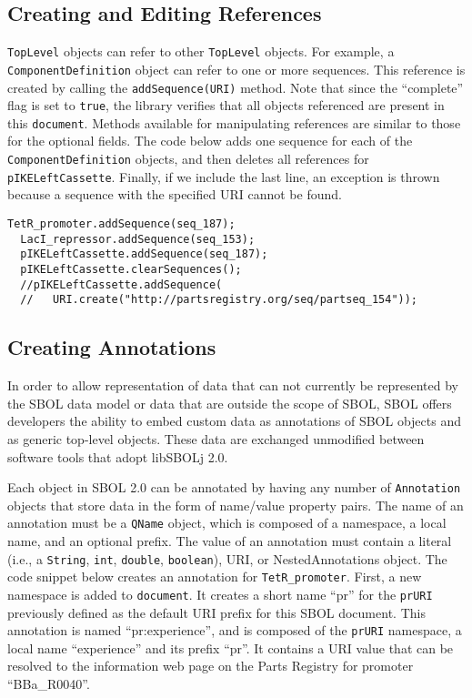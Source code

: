 \subsection*{Creating and Editing References}
\lstinline+TopLevel+ objects can refer to other \lstinline+TopLevel+ objects.  For example, 
a \lstinline+ComponentDefinition+ object can refer to one or more sequences.  This reference is created by calling the \lstinline+addSequence(URI)+ method. Note that since the ``complete'' flag is set to \lstinline+true+, the library verifies that all objects referenced are present in this \lstinline+document+. Methods available for manipulating references are similar
to those for the optional fields. The code below adds one sequence for
each of the \lstinline+ComponentDefinition+ objects, and then deletes all references for \lstinline+pIKELeftCassette+.  Finally, if we include the last line, an exception is thrown because a sequence with the specified URI cannot be found.

\begin{minipage}{0.95\textwidth} 
\begin{lstlisting}[basicstyle=\footnotesize\ttfamily]
  TetR_promoter.addSequence(seq_187);		
  LacI_repressor.addSequence(seq_153);		
  pIKELeftCassette.addSequence(seq_187);
  pIKELeftCassette.clearSequences();
  //pIKELeftCassette.addSequence(
  //   URI.create("http://partsregistry.org/seq/partseq_154"));
\end{lstlisting}
\end{minipage}

\subsection*{Creating Annotations}
In order to allow representation of data that can not currently be represented
by the SBOL data model or data that are outside the scope of SBOL,
SBOL offers developers the ability to embed custom data as annotations
of SBOL objects and as generic top-level objects. These data are exchanged unmodified between
software tools that adopt libSBOLj 2.0. 

Each object in SBOL 2.0 can be annotated by having any number of
\lstinline+Annotation+ objects that store data in the form of name/value 
property pairs. The name of an annotation must be a \lstinline+QName+
object, which is composed of a namespace, a
local name, and an optional prefix. The value of an annotation must contain a literal (i.e., a
\lstinline+String+, \lstinline+int+, \lstinline+double+,
\lstinline+boolean+), URI, or NestedAnnotations object. The code
snippet below creates an annotation for \lstinline+TetR_promoter+. First, a new namespace is added to \lstinline+document+. It creates a short name ``pr'' for the \lstinline+prURI+
previously defined as the default URI prefix for this SBOL
document. This annotation is named ``pr:experience'', and is composed of
the \lstinline+prURI+ namespace, a local name ``experience'' and its prefix ``pr''.  It
contains a URI value that can be resolved to the information web page
on the Parts Registry for promoter ``BBa\_R0040''.

